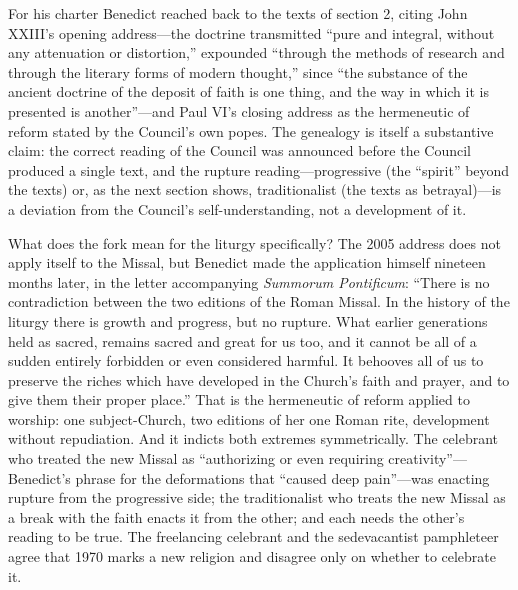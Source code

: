 For his charter Benedict reached back to the texts of section 2, citing John XXIII's opening address---the doctrine transmitted ``pure and integral, without any attenuation or distortion,'' expounded ``through the methods of research and through the literary forms of modern thought,'' since ``the substance of the ancient doctrine of the deposit of faith is one thing, and the way in which it is presented is another''---and Paul VI's closing address as the hermeneutic of reform stated by the Council's own popes. The genealogy is itself a substantive claim: the correct reading of the Council was announced before the Council produced a single text, and the rupture reading---progressive (the ``spirit'' beyond the texts) or, as the next section shows, traditionalist (the texts as betrayal)---is a deviation from the Council's self-understanding, not a development of it.

What does the fork mean for the liturgy specifically? The 2005 address does not apply itself to the Missal, but Benedict made the application himself nineteen months later, in the letter accompanying \emph{Summorum Pontificum}: ``There is no contradiction between the two editions of the Roman Missal. In the history of the liturgy there is growth and progress, but no rupture. What earlier generations held as sacred, remains sacred and great for us too, and it cannot be all of a sudden entirely forbidden or even considered harmful. It behooves all of us to preserve the riches which have developed in the Church's faith and prayer, and to give them their proper place.'' That is the hermeneutic of reform applied to worship: one subject-Church, two editions of her one Roman rite, development without repudiation. And it indicts both extremes symmetrically. The celebrant who treated the new Missal as ``authorizing or even requiring creativity''---Benedict's phrase for the deformations that ``caused deep pain''---was enacting rupture from the progressive side; the traditionalist who treats the new Missal as a break with the faith enacts it from the other; and each needs the other's reading to be true. The freelancing celebrant and the sedevacantist pamphleteer agree that 1970 marks a new religion and disagree only on whether to celebrate it.

